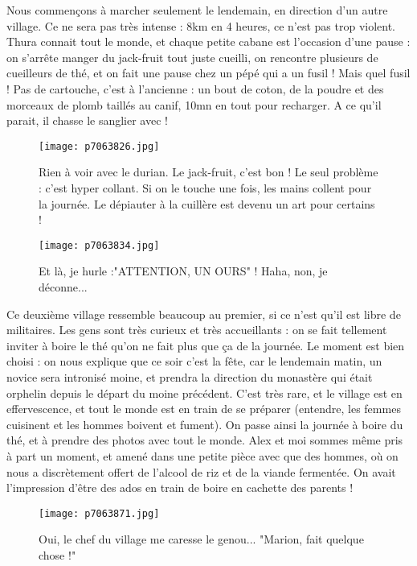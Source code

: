 \documentclass{book}
\begin{document}
Nous commençons à marcher seulement le lendemain, en direction d'un autre village. Ce ne sera pas très intense : 8km en 4 heures, ce n'est pas trop violent. Thura connait tout le monde, et chaque petite cabane est l'occasion d'une pause : on s'arrête manger du jack-fruit tout juste cueilli, on rencontre plusieurs de cueilleurs de thé, et on fait une pause chez un pépé qui a un fusil ! Mais quel fusil ! Pas de cartouche, c'est à l'ancienne : un bout de coton, de la poudre et des morceaux de plomb taillés au canif, 10mn en tout pour recharger. A ce qu'il parait, il chasse le sanglier avec !


\begin{figure}[h]
\centering
\texttt{[image: p7063826.jpg]}
\caption*{Rien à voir avec le durian. Le jack-fruit, c'est bon ! Le seul problème : c'est hyper collant. Si on le touche une fois, les mains collent pour la journée. Le dépiauter à la cuillère est devenu un art pour certains !}
\end{figure}


\begin{figure}[h]
\centering
\texttt{[image: p7063834.jpg]}
\caption*{Et là, je hurle :"ATTENTION, UN OURS" ! Haha, non, je déconne...}
\end{figure}

Ce deuxième village ressemble beaucoup au premier, si ce n'est qu'il est libre de militaires. Les gens sont très curieux et très accueillants : on se fait tellement inviter à boire le thé qu'on ne fait plus que ça de la journée. Le moment est bien choisi : on nous explique que ce soir c'est la fête, car le lendemain matin, un novice sera intronisé moine, et prendra la direction du monastère qui était orphelin depuis le départ du moine précédent. C'est très rare, et le village est en effervescence, et tout le monde est en train de se préparer (entendre, les femmes cuisinent et les hommes boivent et fument). On passe ainsi la journée à boire du thé, et à prendre des photos avec tout le monde. Alex et moi sommes même pris à part un moment, et amené dans une petite pièce avec que des hommes, où on nous a discrètement offert de l'alcool de riz et de la viande fermentée. On avait l'impression d'être des ados en train de boire en cachette des parents !


\begin{figure}[h]
\centering
\texttt{[image: p7063871.jpg]}
\caption*{Oui, le chef du village me caresse le genou... "Marion, fait quelque chose !"}
\end{figure}
\end{document}
